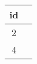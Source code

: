 \begin{tabular}{|c|c|}
    \hline
        \textbf{id} \\ \hline
        2 \\ 
        4 \\ \hline
\end{tabular}